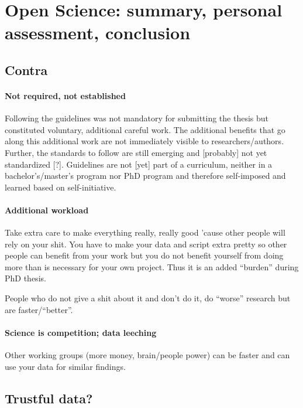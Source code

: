 \section{Open Science: summary, personal assessment, conclusion}


\subsection{Contra}

\paragraph{Not required, not established}
%
Following the guidelines was not mandatory for submitting the thesis but
constituted voluntary, additional careful work.
%
The additional benefits that go along this additional work are not immediately
visible to researchers/authors.
%
Further, the standards to follow are still emerging and [probably] not yet
standardized [?].
%
Guidelines are not [yet] part of a curriculum, neither in a bachelor's/master's
program nor PhD program and therefore self-imposed and learned based on
self-initiative.


\paragraph{Additional workload}
%
Take extra care to make everything really, really good 'cause other people will
rely on your shit.
%
You have to make your data and script extra pretty so other people can benefit
from your work but you do not benefit yourself from doing more than is necessary
for your own project.
%
Thus it is an added ``burden'' during PhD thesis.

%
People who do not give a shit about it and don't do it, do ``worse'' research
but are faster/``better''.


\paragraph{Science is competition; data leeching}
%
Other working groups (more money, brain/people power) can be faster and can use
your data for similar findings.


\subsection{Trustful data?}



